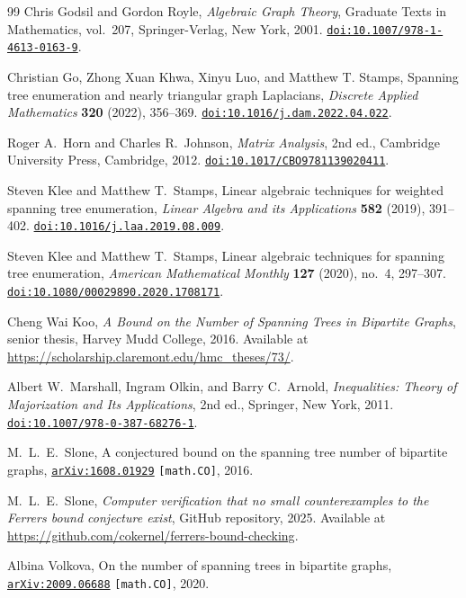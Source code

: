 \documentclass[twoside, reqno]{amsart}
\theoremstyle{definition}
\theoremstyle{remark}
\begin{document}
\begin{thebibliography}{99}
Chris Godsil and Gordon Royle,
\emph{Algebraic Graph Theory},
Graduate Texts in Mathematics, vol.~207, Springer-Verlag, New York, 2001.
\href{https://doi.org/10.1007/978-1-4613-0163-9}{\nolinkurl{doi:10.1007/978-1-4613-0163-9}}.

Christian Go, Zhong Xuan Khwa, Xinyu Luo, and Matthew T. Stamps,
Spanning tree enumeration and nearly triangular graph Laplacians,
\emph{Discrete Applied Mathematics} \textbf{320} (2022), 356--369.
\href{https://doi.org/10.1016/j.dam.2022.04.022}{\nolinkurl{doi:10.1016/j.dam.2022.04.022}}.

Roger A.~Horn and Charles R.~Johnson,
\emph{Matrix Analysis},
2nd ed., Cambridge University Press, Cambridge, 2012.
\href{https://doi.org/10.1017/CBO9781139020411}{\nolinkurl{doi:10.1017/CBO9781139020411}}.

Steven Klee and Matthew T.~Stamps,
Linear algebraic techniques for weighted spanning tree enumeration,
\emph{Linear Algebra and its Applications} \textbf{582} (2019), 391--402.
\href{https://doi.org/10.1016/j.laa.2019.08.009}{\nolinkurl{doi:10.1016/j.laa.2019.08.009}}.

Steven Klee and Matthew T.~Stamps,
Linear algebraic techniques for spanning tree enumeration,
\emph{American Mathematical Monthly} \textbf{127} (2020), no.~4, 297--307.
\href{https://doi.org/10.1080/00029890.2020.1708171}{\nolinkurl{doi:10.1080/00029890.2020.1708171}}.

Cheng Wai Koo,
\emph{A Bound on the Number of Spanning Trees in Bipartite Graphs},
senior thesis, Harvey Mudd College, 2016.
Available at \url{https://scholarship.claremont.edu/hmc_theses/73/}.

Albert W.~Marshall, Ingram Olkin, and Barry C.~Arnold,
\emph{Inequalities: Theory of Majorization and Its Applications},
2nd ed., Springer, New York, 2011.
\href{https://doi.org/10.1007/978-0-387-68276-1}{\nolinkurl{doi:10.1007/978-0-387-68276-1}}.

M.~L.~E.~Slone,
A conjectured bound on the spanning tree number of bipartite graphs,
\href{https://arxiv.org/abs/1608.01929}{\nolinkurl{arXiv:1608.01929}}
\texttt{[math.CO]}, 2016.

M.~L.~E.~Slone,
\emph{Computer verification that no small counterexamples to the Ferrers bound conjecture exist},
GitHub repository, 2025.
Available at \url{https://github.com/cokernel/ferrers-bound-checking}.

Albina Volkova, 
On the number of spanning trees in bipartite graphs,
\href{https://arxiv.org/abs/2009.06688}{\nolinkurl{arXiv:2009.06688}}
\texttt{[math.CO]}, 2020.

\end{thebibliography}
\end{document}
